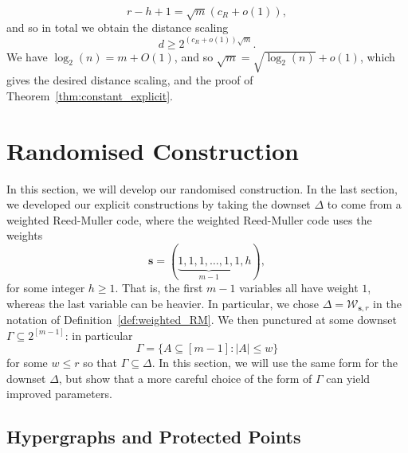 \documentclass{article}
\begin{document}
\begin{equation}
    r-h+1 = \sqrt{m}\left(c_R+o(1)\right),
\end{equation}
and so in total we obtain the distance scaling
\begin{equation}
    d \geq 2^{\left(c_R+o(1)\right)\sqrt{m}}.
\end{equation}
We have $\log_2(n) = m + O(1)$, and so $\sqrt{m} = \sqrt{\log_2(n)} + o(1)$, which gives the desired distance scaling, and the proof of Theorem~\ref{thm:constant_explicit}.

\section{Randomised Construction}\label{sec:random_construction}

In this section, we will develop our randomised construction. In the last section, we developed our explicit constructions by taking the downset $\Delta$ to come from a weighted Reed-Muller code, where the weighted Reed-Muller code uses the weights
\begin{equation}
    \boldsymbol{s} = (\underbrace{1, 1, 1, \ldots, 1, 1}_{m-1}, h),
\end{equation}
for some integer $h \geq 1$. That is, the first $m-1$ variables all have weight $1$, whereas the last variable can be heavier. In particular, we chose $\Delta = \mathcal{W}_{\boldsymbol{s},r}$ in the notation of Definition~\ref{def:weighted_RM}. We then punctured at some downset $\Gamma \subseteq 2^{[m-1]}$: in particular
\begin{equation}
    \Gamma = \{A \subseteq [m-1]: |A| \leq w\}
\end{equation}
for some $w \leq r$ so that $\Gamma \subseteq \Delta$. In this section, we will use the same form for the downset $\Delta$, but show that a more careful choice of the form of $\Gamma$ can yield improved parameters.

\subsection{Hypergraphs and Protected Points}
\end{document}
